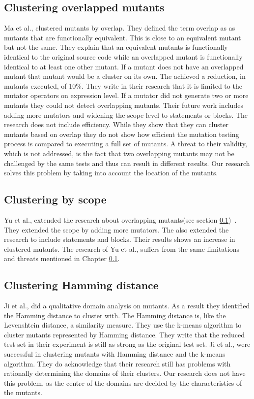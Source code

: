 \documentclass[conference,draftclsnofoot,onecolumn]{IEEEtran}
\begin{document}
\subsection{Clustering overlapped mutants}
\label{ch:overlapping_mutants}
Ma et al., clustered mutants by overlap\cite{Ma2016}.
They defined the term overlap as as mutants that are functionally equivalent.
This is close to an equivalent mutant but not the same.
They explain that an equivalent mutants is functionally identical to the original source code while an overlapped mutant is functionally identical to at least one other mutant.
If a mutant does not have an overlapped mutant that mutant would be a cluster on its own.
The achieved a reduction, in mutants executed, of 10\%.
They write in their research that it is limited to the mutator operators on expression level. 
If a mutator did not generate two or more mutants they could not detect overlapping mutants.
Their future work includes adding more mutators and widening the scope level to statements or blocks.
\newline
The research does not include efficiency.
While they show that they can cluster mutants based on overlap they do not show how efficient the mutation testing process is compared to executing a full set of mutants.
A threat to their validity, which is not addressed, is the fact that two overlapping mutants may not be challenged by the same tests and thus can result in different results.
Our research solves this problem by taking into account the location of the mutants.

\subsection{Clustering by scope}
Yu et al., extended the research about overlapping mutants(see section \ref{ch:overlapping_mutants})~\cite{Yu2019PossibilityScope}.
They extended the scope by adding more mutators.
The also extended the research to include statements and blocks.
Their results shows an increase in clustered mutants.
The research of Yu et al., suffers from the same limitations and threats  mentioned in Chapter \ref{ch:overlapping_mutants}.

\subsection{Clustering Hamming distance}
Ji et al., did a qualitative domain analysis on mutants\cite{Ji2009}.
As a result they identified the Hamming distance to cluster with. 
The Hamming distance is, like the Levenshtein distance, a similarity measure.
They use the k-means algorithm to cluster mutants represented by Hamming distance.
They write that the reduced test set in their experiment is still as strong as the original test set\cite{Ji2009}.
\newline
Ji et al., were successful in clustering mutants with Hamming distance and the k-means algorithm.
They do acknowledge that their research still has problems with rationally determining the domains of their clusters.
Our research does not have this problem, as the centre of the domains are decided by the characteristics of the mutants.
\end{document}
